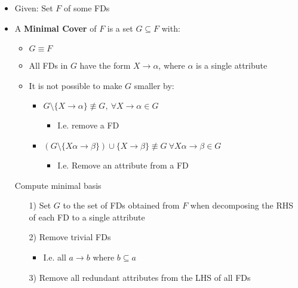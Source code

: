 \begin{itemize}
\begin{itemize}
\begin{itemize}
                \end{itemize}
            \item Given: Set $F$ of some FDs
            \item A \textbf{Minimal Cover} of $F$ is a set $G \subseteq F$ with:
                \begin{itemize}
                    \item $G \equiv F$
                    \item All FDs in $G$ have the form $X \to \alpha$, where $\alpha$ is a single attribute
                    \item It is not possible to make $G$ smaller by:
                        \begin{itemize}
                            \item $G \setminus \{X \to \alpha\} \not\equiv G, \ \forall X \to \alpha \in G$
                                \begin{itemize}
                                    \item I.e. remove a FD
                                \end{itemize}
                            \item $(G \setminus \{X\alpha \to \beta\}) \cup \{X \to \beta\} \not\equiv G\ \forall X\alpha \to \beta \in G$
                                \begin{itemize}
                                    \item I.e. Remove an attribute from a FD
                                \end{itemize}
                        \end{itemize}
                \end{itemize}
             Compute minimal basis
                \begin{itemize}
                    \item[1)] Set $G$ to the set of FDs obtained from $F$ when decomposing the RHS of each FD to a single attribute
                    \item[2)] Remove trivial FDs
                        \begin{itemize}
                            \item I.e. all $a \to b$ where $b \subseteq a$
                        \end{itemize}
                    \item[3)] Remove all redundant attributes from the LHS of all FDs
                        \begin{itemize}

\end{itemize}
\end{itemize}
\end{itemize}
\end{itemize}
